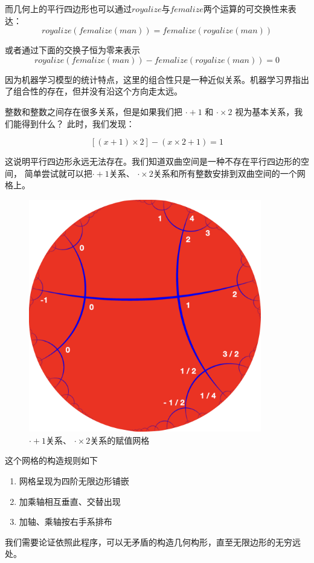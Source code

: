 \documentclass[a4paper,12pt]{article}
\begin{document}
而几何上的平行四边形也可以通过$royalize$与$femalize$两个运算的可交换性来表达：
$$
    royalize(femalize(man)) = femalize(royalize(man))
$$

或者通过下面的交换子恒为零来表示
$$
    royalize(femalize(man)) - femalize(royalize(man)) = 0
$$

因为机器学习模型的统计特点，这里的组合性只是一种近似关系。机器学习界指出了组合性的存在，但并没有沿这个方向走太远。

整数和整数之间存在很多关系，但是如果我们把 $\cdot + 1$ 和 $\cdot \times 2$ 视为基本关系，我们能得到什么？ 此时，我们发现：

$$
[(x + 1) \times 2] - (x \times 2 + 1) = 1
$$

这说明平行四边形永远无法存在。我们知道双曲空间是一种不存在平行四边形的空间，
简单尝试就可以把$\cdot + 1$关系、 $\cdot \times 2$关系和所有整数安排到双曲空间的一个网格上。

\begin{figure}[ht]
\centering
\includegraphics[width=4in]{images/assignment2.png}
\caption{$\cdot + 1$关系、 $\cdot \times 2$关系的赋值网格}
\end{figure}

这个网格的构造规则如下
\begin{enumerate}
    \item 网格呈现为四阶无限边形铺嵌
    \item 加乘轴相互垂直、交替出现
    \item 加轴、乘轴按右手系排布
\end{enumerate}

我们需要论证依照此程序，可以无矛盾的构造几何构形，直至无限边形的无穷远处。
\end{document}
